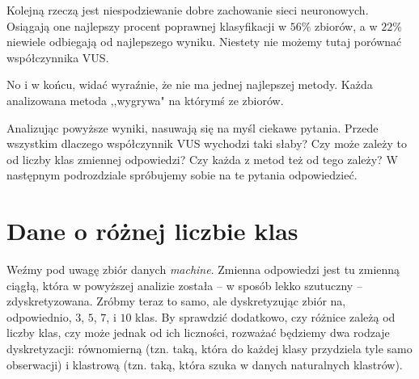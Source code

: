 \documentclass{mini}
\begin{document}
Kolejną rzeczą jest niespodziewanie dobre zachowanie sieci neuronowych. Osiągają one najlepszy procent poprawnej klasyfikacji w $56\%$ zbiorów, a w $22\%$ niewiele odbiegają  od najlepszego wyniku. Niestety nie możemy tutaj porównać współczynnika VUS. 

No i w końcu, widać wyraźnie, że nie ma jednej najlepszej metody. Każda analizowana metoda ,,wygrywa" na którymś ze zbiorów.

Analizując powyższe wyniki, nasuwają się na myśl ciekawe pytania. Przede wszystkim dlaczego współczynnik VUS wychodzi taki słaby? Czy może zależy to od liczby klas zmiennej odpowiedzi? Czy każda z metod też od tego zależy? W następnym podrozdziale spróbujemy sobie na te pytania odpowiedzieć. 

\section{Dane o różnej liczbie klas}

Weźmy pod uwagę zbiór danych \textit{machine}. Zmienna odpowiedzi jest tu zmienną ciągłą, która w powyższej analizie została -- w sposób lekko szutuczny -- zdyskretyzowana. Zróbmy teraz to samo, ale dyskretyzując zbiór na, odpowiednio, $3$, $5$, $7$, i $10$ klas. By sprawdzić dodatkowo, czy różnice zależą od liczby klas, czy może jednak od ich liczności, rozważać będziemy dwa rodzaje dyskretyzacji: równomierną (tzn. taką, która do każdej klasy przydziela tyle samo obserwacji) i klastrową (tzn. taką, która szuka w danych naturalnych klastrów). 
\end{document}
